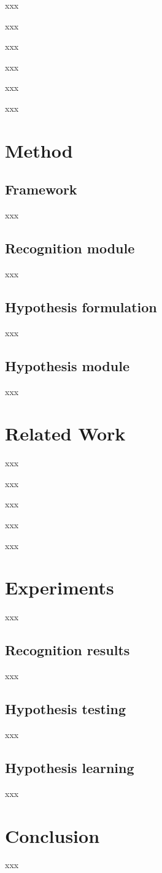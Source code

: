 \documentclass[10pt,twocolumn,letterpaper]{article}
\begin{document}
xxx

xxx

xxx

xxx

xxx

xxx

\section{Method}

\subsection{Framework}
xxx

\subsection{Recognition module}
xxx

\subsection{Hypothesis formulation}
xxx

\subsection{Hypothesis module}
xxx

\section{Related Work}
xxx

xxx

xxx

xxx

xxx

\section{Experiments}
xxx

\subsection{Recognition results}
xxx

\subsection{Hypothesis testing}
xxx

\subsection{Hypothesis learning}
xxx

\section{Conclusion}
xxx

{\small


}
\end{document}
